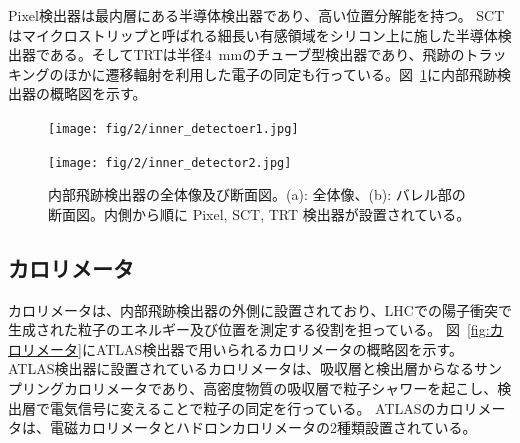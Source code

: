 Pixel検出器は最内層にある半導体検出器であり、高い位置分解能を持つ\cite{Aad:1129811}。
SCT はマイクロストリップと呼ばれる細長い有感領域をシリコン上に施した半導体検出器である\cite{Aad:1129811}。そしてTRTは半径4~mmのチューブ型検出器であり、飛跡のトラッキングのほかに遷移輻射を利用した電子の同定も行っている。図~\ref{fig:内部飛跡検出器}に内部飛跡検出器の概略図を示す。

\begin{figure}
    \centering
    \begin{minipage}[b]{0.4\linewidth}
        \centering
        \texttt{[image: fig/2/inner\_detectoer1.jpg]}
        \vspace{10pt}
        \subcaption{}
        \label{fig:内部飛跡検出器の概略図1}
    \end{minipage}
    \hfill
    \begin{minipage}[b]{0.5\linewidth}
        \centering
        \texttt{[image: fig/2/inner\_detector2.jpg]}
        \vspace{10pt}
        \subcaption{}
        \label{fig:内部飛跡検出器の概略図2}
    \end{minipage}
    \caption{内部飛跡検出器の全体像及び断面図。(a): 全体像\cite{Aad:1129811}、(b): バレル部の断面図\cite{Collaboration:2723878}。内側から順に Pixel, SCT, TRT 検出器が設置されている。}
    \label{fig:内部飛跡検出器}
\end{figure}



\subsection{カロリメータ}
カロリメータは、内部飛跡検出器の外側に設置されており、LHCでの陽子衝突で生成された粒子のエネルギー及び位置を測定する役割を担っている。
図~\ref{fig:カロリメータ}にATLAS検出器で用いられるカロリメータの概略図を示す。
ATLAS検出器に設置されているカロリメータは、吸収層と検出層からなるサンプリングカロリメータであり、高密度物質の吸収層で粒子シャワーを起こし、検出層で電気信号に変えることで粒子の同定を行っている。
ATLASのカロリメータは、電磁カロリメータとハドロンカロリメータの2種類設置されている。

